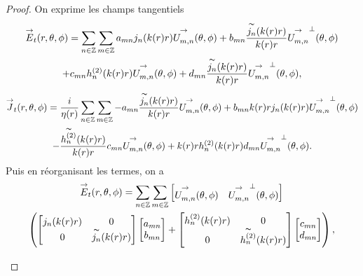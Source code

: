     \begin{proof}
        On exprime les champs tangentiels
        \begin{multline*}
            {\overset{\rightarrow}{E}}_t(r,\theta,\phi) = \sum_{n\in\mathbb Z}\sum_{m\in\mathbb Z} a_{mn} j_n(k(r)r){\overset{\rightarrow}{U_{m,n}^{{}}}}(\theta,\phi) + b_{mn} \dfrac{\overset{\thicksim}{j_n}(k(r)r)}{k(r)r}{\overset{\rightarrow}{U_{m,n}^{{}}}}^\perp(\theta,\phi)
            \\
            + c_{mn} h^{(2)}_n(k(r)r){\overset{\rightarrow}{U_{m,n}^{{}}}}(\theta,\phi) + d_{mn} \dfrac{\overset{\thicksim}{j_n}(k(r)r)}{k(r)r}{\overset{\rightarrow}{U_{m,n}^{{}}}}^\perp(\theta,\phi),
        \end{multline*}
        \begin{multline*}
            {\overset{\rightarrow}{J}}_t(r,\theta,\phi) = \dfrac{i}{\eta(r)}\sum_{n\in\mathbb Z}\sum_{m\in\mathbb Z} - a_{mn} \dfrac{\overset{\thicksim}{j_n}(k(r)r)}{k(r)r}{\overset{\rightarrow}{U_{m,n}^{{}}}}(\theta,\phi) + b_{mn} k(r)r j_n(k(r)r) {\overset{\rightarrow}{U_{m,n}^{{}}}}^\perp(\theta,\phi)
            \\
            -  \dfrac{\overset{\thicksim}{h^{(2)}_n}(k(r)r)}{k(r)r} c_{mn} {\overset{\rightarrow}{U_{m,n}^{{}}}}(\theta,\phi) + k(r)r h^{(2)}_n(k(r)r) d_{mn} {\overset{\rightarrow}{U_{m,n}^{{}}}}^\perp(\theta,\phi).
        \end{multline*}
        Puis en réorganisant les termes, on a
        \begin{multline*}
            {\overset{\rightarrow}{E}}_t(r,\theta,\phi) = \sum_{n\in\mathbb Z}\sum_{m\in\mathbb Z}
            \begin{bmatrix}
              {\overset{\rightarrow}{U_{m,n}^{{}}}}(\theta,\phi) & {\overset{\rightarrow}{U_{m,n}^{{}}}}^\perp(\theta,\phi)
            \end{bmatrix}
            \\
            \left(
              \begin{bmatrix}
                j_n(k(r)r) & 0
                \\              
                0 & \overset{\thicksim}{j_n}(k(r)r)
              \end{bmatrix}
              \begin{bmatrix}
                  a_{mn}
                  \\
                  b_{mn}
              \end{bmatrix}
              +
              \begin{bmatrix}
                h^{(2)}_n(k(r)r) & 0
                \\
                0 & \overset{\thicksim}{h^{(2)}_n}(k(r)r)
              \end{bmatrix}
              \begin{bmatrix}
                  c_{mn}
                  \\
                  d_{mn}
              \end{bmatrix}
            \right),
        \end{multline*}
        \begin{multline*}

\end{multline*}
\end{proof}
